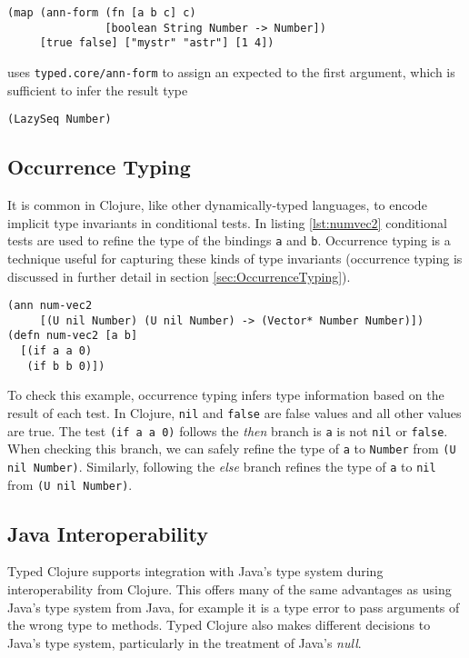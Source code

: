 \begin{lstlisting}
(map (ann-form (fn [a b c] c) 
               [boolean String Number -> Number]) 
     [true false] ["mystr" "astr"] [1 4])
\end{lstlisting}

uses \lstinline|typed.core/ann-form| to assign an expected to
the first argument,
which is sufficient to infer the result type

\begin{lstlisting}
(LazySeq Number)
\end{lstlisting}


\subsection{Occurrence Typing}

It is common in Clojure, like other dynamically-typed languages, to
encode implicit type invariants in conditional tests.
In listing \ref{lst:numvec2} conditional tests are used
to refine the type of the bindings \lstinline|a| and \lstinline|b|.
Occurrence typing\cite{TF10} is a technique useful for capturing these kinds
of type invariants (occurrence typing is discussed in further detail in section \ref{sec:OccurrenceTyping}).

\begin{lstlisting}[caption=Example of occurrence typing in Typed Clojure, label=lst:numvec2]
(ann num-vec2 
     [(U nil Number) (U nil Number) -> (Vector* Number Number)])
(defn num-vec2 [a b]
  [(if a a 0) 
   (if b b 0)])
\end{lstlisting}

To check this example, occurrence typing infers type information based on the result of each test.
In Clojure, \lstinline|nil| and \lstinline|false| are false values and all other values are true.
The test \lstinline|(if a a 0)| follows the \emph{then} branch is \lstinline|a| is not \lstinline|nil|
or \lstinline|false|. When checking this branch, we can safely refine the type of \lstinline|a| to \lstinline|Number| from
\lstinline|(U nil Number)|. Similarly, following the \emph{else} branch refines the type of \lstinline|a|
to \lstinline|nil| from \lstinline|(U nil Number)|.

\subsection{Java Interoperability}
\label{sec:javainterop}

Typed Clojure supports integration with Java's type system during
interoperability from Clojure. This offers many of the same advantages
as using Java's type system from Java, for example it is a type
error to pass arguments of the wrong type to methods.
Typed Clojure also makes different decisions to Java's type system,
particularly in the treatment of Java's \emph{null}.


